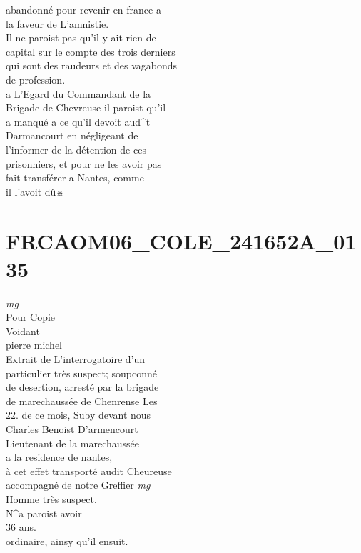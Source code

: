 \documentclass{article}
\begin{document}
\begin{pages}
abandonné pour revenir en france a\\
la faveur de L'amnistie.\\
Il ne paroist pas qu'il y ait rien de\\
capital sur le compte des trois derniers\\
qui sont des raudeurs et des vagabonds\\
de profession.\\
a L'Egard du Commandant de la\\
Brigade de Chevreuse il paroist qu'il\\
a manqué a ce qu'il devoit aud\^{}t\\
Darmancourt en négligeant de\\
l'informer de la détention de ces\\
prisonniers, et pour ne les avoir pas\\
fait transférer a Nantes, comme\\
il  l'avoit dû※
\pend
\endnumbering\beginnumbering\section{FRCAOM06\_COLE\_241652A\_0135}
\vspace{0.5cm}\noindent
\textit{mg}
\footnotesize \\
Pour Copie\\
Voidant\\
pierre michel
\normalsize \pstart
\\
Extrait de L'interrogatoire d'un\\
particulier très suspect; soupconné\\
de desertion, arresté par la brigade\\
de marechaussée de Chenrense Les\\
22. de ce mois, Suby devant nous\\
Charles Benoist D'armencourt\\
Lieutenant de la marechaussée\\
a la residence de nantes,\\
à cet effet transporté audit Cheureuse\\
accompagné de notre Greffier
\pend
\vspace{0.5cm}\noindent
\textit{mg}
\footnotesize \\
Homme très suspect.\\
N\^{}a paroist avoir\\
36 ans.
\normalsize \pstart
\\
ordinaire, ainsy qu'il ensuit.\\

\end{pages}
\end{document}

